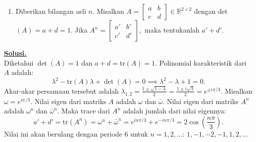 \documentclass[12pt,twoside]{article}
\newenvironment{solution}
{
	\par\noindent\textbf{\underline{Solusi.}}\\
}
{
	\par
}
\begin{document}
\begin{enumerate}
\begin{solution}
\begin{enumerate}
            \item Pernyataan ini \textbf{benar}.
                  Diketahui $g(z)$ analitik di sekitar $z=0$. Misalkan $g(z) = \sum_{k=0}^{\infty} c_k z^k$.
                  Kita punya $g(z) = f(z^{2018})$. Perhatikan bahwa $g(z)$ harus invarian terhadap rotasi $z \mapsto \omega z$ di mana $\omega = e^{2\pi i / 2018}$, karena $(\omega z)^{2018} = z^{2018}$.
                  \[ g(\omega z) = f((\omega z)^{2018}) = f(z^{2018}) = g(z). \]
                  Ini mengimplikasikan bahwa koefisien $c_k = 0$ jika $k$ bukan kelipatan $2018$.
                  Tulis $k = 2018 m$. Maka deret pangkat $g$ berbentuk $g(z) = \sum_{m=0}^{\infty} a_m (z^{2018})^m$.
                  Karena deret ini konvergen untuk $|z| < R$, maka deret $h(w) = \sum_{m=0}^{\infty} a_m w^m$ konvergen untuk $|w| < R^{2018}$.
                  Perhatikan bahwa $g(z) = h(z^{2018})$. Peta $z \mapsto z^{2018}$ bersifat surjektif pada suatu lingkungan 0 (Open Mapping Theorem), sehingga himpunan nilai $w = z^{2018}$ menutupi suatu cakram di sekitar 0.
                  Karena $f(w) = h(w)$ untuk $w$ di cakram tersebut, dan $h(w)$ analitik, maka $f$ analitik dan memiliki turunan di 0.
          \end{enumerate}
        \end{solution}


  \item Diberikan bilangan asli $n$. Misalkan $A =\begin{bmatrix}
            a & b \\ c& d
          \end{bmatrix} \in \mathbb{R}^{2\times2}$ dengan det$(A) = a+d =1$. Jika $A^n = \begin{bmatrix}
            a' & b' \\ c'&d'
          \end{bmatrix},$ maka tentukanlah $a'+d'$.
\end{enumerate}

\begin{solution}
  Diketahui $\det(A) = 1$ dan $a+d = \text{tr}(A) = 1$.
  Polinomial karakteristik dari $A$ adalah:
  \[ \lambda^2 - \text{tr}(A)\lambda + \det(A) = 0 \implies \lambda^2 - \lambda + 1 = 0. \]
  Akar-akar persamaan tersebut adalah $\lambda_{1,2} = \frac{1 \pm \sqrt{1-4}}{2} = \frac{1 \pm i\sqrt{3}}{2} = e^{\pm i\pi/3}$.
  Misalkan $\omega = e^{i\pi/3}$. Nilai eigen dari matriks $A$ adalah $\omega$ dan $\bar{\omega}$.
  Nilai eigen dari matriks $A^n$ adalah $\omega^n$ dan $\bar{\omega}^n$.
  Maka trace dari $A^n$ adalah jumlah dari nilai eigennya:
  \[ a' + d' = \text{tr}(A^n) = \omega^n + \bar{\omega}^n = e^{in\pi/3} + e^{-in\pi/3} = 2\cos\left(\frac{n\pi}{3}\right). \]
  Nilai ini akan berulang dengan periode 6 untuk $n=1, 2, \dots$:
  $1, -1, -2, -1, 1, 2, \dots$
\end{solution}
\end{document}
